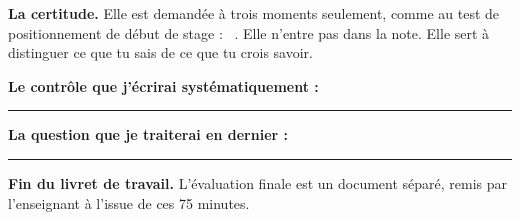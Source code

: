 \documentclass[10pt,a4paper]{article}
\begin{document}
\begin{graybox}
\textbf{La certitude.} Elle est demandée à trois moments seulement, comme au test de positionnement de début de stage :
\conf\ . Elle n'entre pas dans la note. Elle sert à distinguer ce que tu sais de ce que tu crois savoir.
\end{graybox}

\par\vspace{1mm}
\noindent\textbf{Le contrôle que j'écrirai systématiquement :}\ \rule{\dimexpr\linewidth-76mm\relax}{0.32pt}
\par\vspace{3mm}
\noindent\textbf{La question que je traiterai en dernier :}\ \rule{\dimexpr\linewidth-68mm\relax}{0.32pt}
\par\vspace{1mm}

\begin{warningbox}\textbf{Fin du livret de travail.} L'évaluation finale est un document séparé, remis par l'enseignant à l'issue de ces 75 minutes.\end{warningbox}
\end{document}
